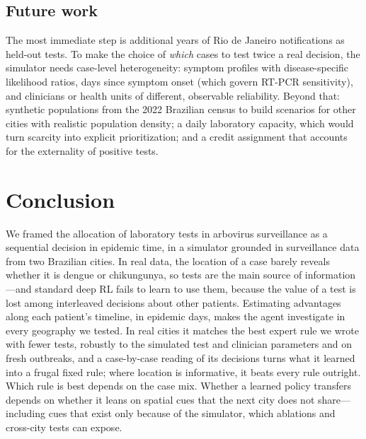 \documentclass[11pt,a4paper]{article}
\begin{document}
\subsection{Future work}

The most immediate step is additional years of Rio de Janeiro notifications as held-out tests. To make the choice of \emph{which} cases to test twice a real decision, the simulator needs case-level heterogeneity: symptom profiles with disease-specific likelihood ratios, days since symptom onset (which govern RT-PCR sensitivity), and clinicians or health units of different, observable reliability. Beyond that: synthetic populations from the 2022 Brazilian census \cite{syntheticpop} to build scenarios for other cities with realistic population density; a daily laboratory capacity, which would turn scarcity into explicit prioritization; and a credit assignment that accounts for the externality of positive tests.

\section{Conclusion}

We framed the allocation of laboratory tests in arbovirus surveillance as a sequential decision in epidemic time, in a simulator grounded in surveillance data from two Brazilian cities. In real data, the location of a case barely reveals whether it is dengue or chikungunya, so tests are the main source of information---and standard deep RL fails to learn to use them, because the value of a test is lost among interleaved decisions about other patients. Estimating advantages along each patient's timeline, in epidemic days, makes the agent investigate in every geography we tested. In real cities it matches the best expert rule we wrote with fewer tests, robustly to the simulated test and clinician parameters and on fresh outbreaks, and a case-by-case reading of its decisions turns what it learned into a frugal fixed rule; where location is informative, it beats every rule outright. Which rule is best depends on the case mix. Whether a learned policy transfers depends on whether it leans on spatial cues that the next city does not share---including cues that exist only because of the simulator, which ablations and cross-city tests can expose.



\end{document}
